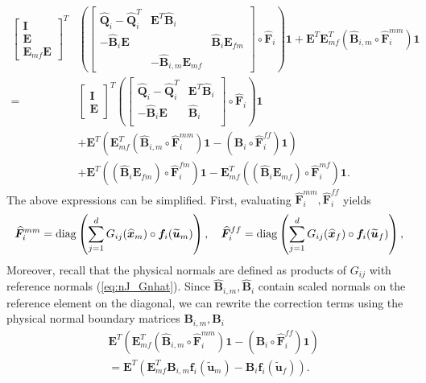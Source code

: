 \documentclass{svjour3}                     %
\renewcommand{\hat}{\widehat}
\renewcommand{\tilde}{\widetilde}
\newcommand{\diag}[1]{{\rm diag}\LRp{#1}}
\newcommand{\LRp}[1]{\left( #1 \right)}
\begin{document}
\begin{align*}
\begin{bmatrix} \bm{I} \\ \bm{E} \\ \bm{E}_{mf}\bm{E} \end{bmatrix}^T
&\LRp{\begin{bmatrix}
\hat{\bm{Q}}_i-\hat{\bm{Q}}_i^T & \bm{E}^T\hat{\bm{B}}_i &\\
-\hat{\bm{B}}_i\bm{E} &  & \hat{\bm{B}}_{i}{\bm{E}}_{fm} \\
& -\hat{\bm{B}}_{i,m}{\bm{E}}_{mf} & 
\end{bmatrix} \circ \hat{\bm{F}}_i}\bm{1} 
+ \bm{E}^T\bm{E}_{mf}^T \LRp{\hat{\bm{B}}_{i,m} \circ \hat{\bm{F}}_i^{mm}}\bm{1} 
\\
=& 
\begin{bmatrix} \bm{I} \\ \bm{E} \end{bmatrix}^T
\LRp{\begin{bmatrix}
\hat{\bm{Q}}_i-\hat{\bm{Q}}_i^T  & \bm{E}^T\hat{\bm{B}}_i\\
-\hat{\bm{B}}_i\bm{E} & \hat{\bm{B}}_i\\
\end{bmatrix} \circ \hat{\bm{F}}_i}\bm{1} \\
&+ \bm{E}^T\LRp{\bm{E}_{mf}^T \LRp{\hat{\bm{B}}_{i,m} \circ \hat{\bm{F}}_i^{mm}}\bm{1} - \LRp{\bm{B}_i\circ \hat{\bm{F}}^{ff}_i}\bm{1} } \\
&+ \bm{E}^T \LRp{\LRp{\hat{\bm{B}}_i\bm{E}_{fm}}\circ \hat{\bm{F}}_i^{fm}}\bm{1} - \bm{E}_{mf}^T \LRp{ \LRp{\hat{\bm{B}}_i\bm{E}_{mf}} \circ \hat{\bm{F}}_i^{mf}}\bm{1}.
\end{align*}
The above expressions can be simplified.  First, evaluating $\hat{\bm{F}}_i^{mm},\hat{\bm{F}}_i^{ff}$ yields
\[
\hat{\bm{F}}_i^{mm} = \diag{\sum_{j=1}^d G_{ij}(\hat{\bm{x}}_m) \circ \bm{f}_i(\tilde{\bm{u}}_m)}, 
\quad 
\hat{\bm{F}}_i^{ff} = \diag{\sum_{j=1}^d G_{ij}(\hat{\bm{x}}_f) \circ \bm{f}_i(\tilde{\bm{u}}_f)},
\]
Moreover, recall that the physical normals are defined as products of $G_{ij}$ with reference normals (\ref{eq:nJ_Gnhat}).  Since $\hat{\bm{B}}_{i,m}, \hat{\bm{B}}_{i}$ contain scaled normals on the reference element on the diagonal, we can rewrite the correction terms using the physical normal boundary matrices $\bm{B}_{i,m}, \bm{B}_i$
\begin{align*}
&\bm{E}^T\LRp{\bm{E}_{mf}^T \LRp{\hat{\bm{B}}_{i,m} \circ \hat{\bm{F}}_i^{mm}}\bm{1} - \LRp{\bm{B}_i\circ \hat{\bm{F}}^{ff}_i}\bm{1} } \\
&= \bm{E}^T\LRp{\bm{E}_{mf}^T \bm{B}_{i,m}\bm{f}_i(\tilde{\bm{u}}_m) - \bm{B}_{i}\bm{f}_i(\tilde{\bm{u}}_f) }.
\end{align*}
\end{document}
